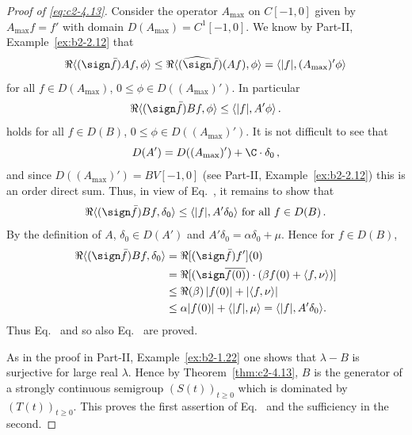 \begin{example}
\begin{proof}[Proof of \eqref{eq:c2-4.13}]
Consider the operator $A_{\max}$ on $C[-1,0]$ given by $A_{\max}f = f'$ with domain $D(A_{\max}) = C^{1}[-1,0]$.
We know by Part-II, Example~\ref{ex:b2-2.12} 
that 
\[
\Re\langle(\sign  \bar{f})Af,\phi\rangle \leq \Re\langle(\widehat{\sign}  \bar{f})(Af),\phi\rangle = \langle|f|, (A_{\max})'\phi\rangle
\]
for all $f \in D(A_{\max})$, $0 \leq \phi \in D((A_{\max})')$.
In particular
\begin{equation}\label{eq:c2-4.14}
\Re\langle(\sign  \bar{f})Bf,\phi\rangle \leq \langle|f|,A'\phi\rangle\,.
\end{equation}
holds for all $f \in D(B)$, $0 \leq \phi \in D((A_{\max})')$.
It is not difficult to see that 
\[
D(A') = D((A_{\max})') + \C\cdot\delta_{0}\,,
\]
and since $D((A_{\max})') = BV[-1,0]$
(see Part-II, Example~\ref{ex:b2-2.12})
this is an order direct sum.
Thus, in view of Eq.~, it remains to show that
\begin{equation}\label{eq:c2-4.15}
\Re\langle(\sign  \bar{f})Bf,\delta_{0}\rangle \leq \langle|f|,A'\delta_{0}\rangle \text{ for all } f \in D(B)\,.
\end{equation}
By the definition of\/ $A$, $\delta_{0} \in D(A')$ and $A'\delta_{0} =  \alpha\delta_{0} + \mu$.
Hence for $f \in D(B)$,
\begin{align*}
\Re\langle(\sign \bar{f})Bf,\delta_{0}\rangle &= \Re[(\sign \bar{f})f'](0) \\
&= \Re[(\sign  \overline{f(0)})\cdot(\beta f(0) +  \langle f,\nu\rangle)] \\
&\leq \Re(\beta) \, |f(0)| + |\langle f,\nu\rangle| \\
&\leq \alpha|f(0)| + \langle|f|,\mu\rangle = \langle|f|,A'\delta_{0}\rangle.
\end{align*}
Thus Eq.~ and so also Eq.~ are proved.

As in the proof in  Part-II, Example~\ref{ex:b2-1.22} one shows that $\lambda - B$ is surjective for large real $\lambda$.
Hence by Theorem~\ref{thm:c2-4.13}, $B$ is the generator of a
strongly continuous semigroup $(S(t))_{t \geq 0}$ which is dominated by
$(T(t))_{t \geq 0}$.
This proves the first assertion of Eq.~ and the sufficiency in the second.


\end{proof}
\end{example}
